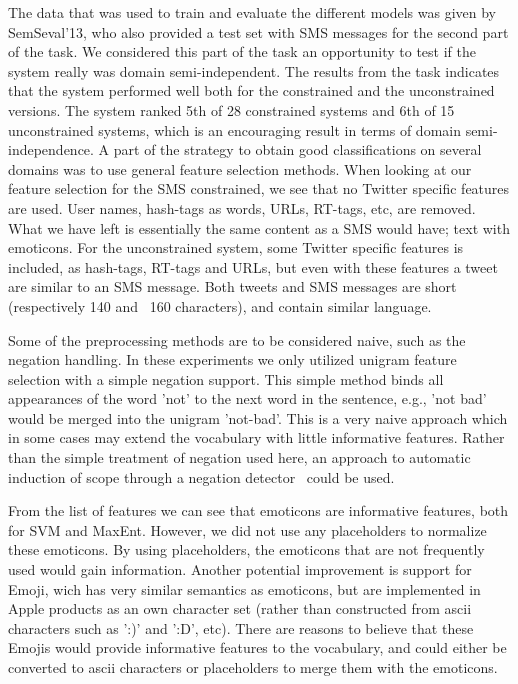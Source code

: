 The data that was used to train and evaluate the different models was given by SemSeval'13, who also provided a test set with SMS messages for the second part of the task. We considered this part of the task an opportunity to test if the system really was domain semi-independent. The results from the task indicates that the system performed well both for the constrained and the unconstrained versions. The system ranked 5th of 28 constrained systems and 6th of 15 unconstrained systems, which is an encouraging result in terms of domain semi-independence. A part of the strategy to obtain good classifications on several domains was to use general feature selection methods. When looking at our feature selection for the SMS constrained, we see that no Twitter specific features are used. User names, hash-tags as words, URLs, RT-tags, etc, are removed. What we have left is essentially the same content as a SMS would have; text with emoticons. For the unconstrained system, some Twitter specific features is included, as hash-tags, RT-tags and URLs, but even with these features a tweet are similar to an SMS message. Both tweets and SMS messages are short (respectively 140 and ~160 characters), and contain similar language. 

Some of the preprocessing methods are to be considered naive, such as the negation handling. In these experiments we only utilized unigram feature selection with a simple negation support. This simple method binds all appearances of the word 'not' to the next word in the sentence, e.g., 'not bad' would be merged into the unigram 'not-bad'. This is a very naive approach which in some cases may extend the vocabulary with little informative features. Rather than the simple treatment of negation used here, an approach to automatic induction of scope through a negation detector~\citep{CouncillEA:10} could be used.

From the list of features we can see that emoticons are informative features, both for SVM and MaxEnt. However, we did not use any placeholders to normalize these emoticons. By using placeholders, the emoticons that are not frequently used would gain information. Another potential improvement is support for Emoji, wich has very similar semantics as emoticons, but are implemented in Apple products as an own character set (rather than constructed from ascii characters such as ':)' and ':D', etc). There are reasons to believe that these Emojis would provide informative features to the vocabulary, and could either be converted to ascii characters or placeholders to merge them with the emoticons.

